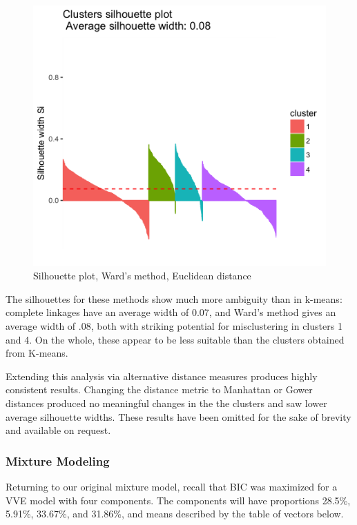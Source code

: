 \documentclass[10pt,a4paper, hidelinks]{article} %
\begin{document}
\begin{figure}[H]
	\centering
	\includegraphics[width=0.5\linewidth]{"../fig/wardsil"}
		\caption{Silhouette plot, Ward's method, Euclidean distance}
\end{figure}

The silhouettes for these methods show much more ambiguity than in k-means: complete linkages have an average width of 0.07, and Ward's method gives an average width of .08, both with striking potential for misclustering in clusters 1 and 4.  On the whole, these appear to be less suitable than the clusters obtained from K-means.

Extending this analysis via alternative distance measures produces highly consistent results.  Changing the distance metric to Manhattan or Gower distances produced no meaningful changes in the the clusters and saw lower average silhouette widths.  These results have been omitted for the sake of brevity and available on request.

\subsubsection{Mixture Modeling}

Returning to our original mixture model, recall that BIC was maximized for a VVE model with four components.  The components will have proportions 28.5\%, 5.91\%, 33.67\%, and 31.86\%, and means described by the table of vectors below.
\end{document}
